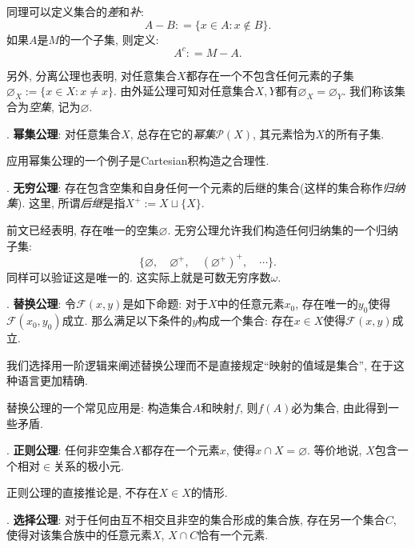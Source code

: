 同理可以定义集合的\textit{差}和\textit{补}: $$A - B : = \{ x \in A :  x \notin B \}.$$
如果$A$是$M$的一个子集, 则定义: $$A^c : = M - A.$$

另外, 分离公理也表明, 对任意集合$X$都存在一个不包含任何元素的子集$\varnothing _X:=\{ x \in X:x \neq x \}$. 由外延公理可知对任意集合$X, Y$都有$\varnothing _X = \varnothing _Y$. 我们称该集合为\textit{空集}, 记为$\varnothing$. 

\vspace{0.5em}
. \textbf{幂集公理}: 对任意集合$X$, 总存在它的\textit{幂集}$\mathcal{P}(X)$, 其元素恰为$X$的所有子集. 

应用幂集公理的一个例子是Cartesian积构造之合理性. 

\vspace{0.5em}
. \textbf{无穷公理}: 存在包含空集和自身任何一个元素的后继的集合(这样的集合称作\textit{归纳集}). 这里, 所谓\textit{后继}是指$X^{+}:=X \sqcup \{ X \}$. 

前文已经表明, 存在唯一的空集$\varnothing$. 无穷公理允许我们构造任何归纳集的一个归纳子集: $$\{ \varnothing ,\quad \varnothing ^+ ,\quad (\varnothing ^+)^+, \quad \cdots \} .$$
同样可以验证这是唯一的. 这实际上就是可数无穷序数$\omega$. 

\vspace{0.5em}
. \textbf{替换公理}: 令$\mathcal{F}(x, y)$是如下命题: 对于$X$中的任意元素$x_0$, 存在唯一的$y_0$使得$\mathcal{F}(x_0, y_0)$成立. 那么满足以下条件的$y$构成一个集合: 存在$x \in X$使得$\mathcal{F}(x, y)$成立. 

我们选择用一阶逻辑来阐述替换公理而不是直接规定“映射的值域是集合”, 在于这种语言更加精确. 

替换公理的一个常见应用是: 构造集合$A$和映射$f$, 则$f(A)$必为集合, 由此得到一些矛盾. 

\vspace{0.5em}
. \textbf{正则公理}: 任何非空集合$X$都存在一个元素$x$, 使得$x \cap X = \varnothing$. 等价地说, $X$包含一个相对$\in $关系的极小元. 

正则公理的直接推论是, 不存在$X \in X$的情形. 

\vspace{0.5em}
. \textbf{选择公理}: 对于任何由互不相交且非空的集合形成的集合族, 存在另一个集合$C$, 使得对该集合族中的任意元素$X$, $X \cap C$恰有一个元素.


